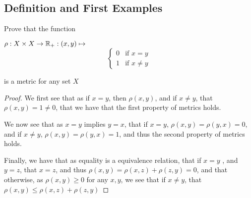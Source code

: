 \subsection{Definition and First Examples}

\begin{majorEx}
  Prove that the function
  \begin{center}
  $\rho : X \times X \rightarrow \mathbb{R}_+ : (x,y) \mapsto $
  \[ \begin{cases} 
    0 & \text{if } x=y \\
    1 & \text{if } x \neq y 
  \end{cases}
  \]
\end{center}
is a metric for any set $X$
\begin{proof}
   We first see that as if $x=y$, then $\rho(x,y)$, and if $x\neq y$, that $\rho(x,y)=1\neq 0$, that we have that the first property of metrics holds.

   We now see that as $x=y$ implies $y=x$, that if $x=y$, 
   $\rho(x,y)=\rho(y,x)=0$, and if $x\neq y$, $\rho(x,y)=\rho(y,x)=1$, and thus the 
   second property of metrics holds.

   Finally, we have that as equality is a equivalence relation, that if $x=y$ , and $y=z$, 
   that $x=z$, and thus $\rho(x,y) = \rho(x,z)+ \rho(z,y)=0$, and that otherwise, as $\rho(x,y)\geq 0$ for any $x,y$, we see that if $x\neq y$, that $\rho(x,y) \leq \rho(x,z)+ \rho(z,y)$   
\end{proof}  
  
\end{majorEx}